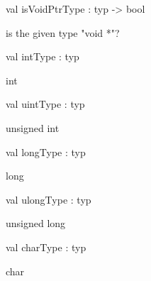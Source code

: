 \documentclass[11pt]{article}
\begin{document}
\label{val:Cil.isVoidPtrType}\begin{ocamldoccode}
val isVoidPtrType : typ -> bool
\end{ocamldoccode}
\begin{ocamldocdescription}
is the given type "void *"?


\end{ocamldocdescription}




\label{val:Cil.intType}\begin{ocamldoccode}
val intType : typ
\end{ocamldoccode}
\begin{ocamldocdescription}
int


\end{ocamldocdescription}




\label{val:Cil.uintType}\begin{ocamldoccode}
val uintType : typ
\end{ocamldoccode}
\begin{ocamldocdescription}
unsigned int


\end{ocamldocdescription}




\label{val:Cil.longType}\begin{ocamldoccode}
val longType : typ
\end{ocamldoccode}
\begin{ocamldocdescription}
long


\end{ocamldocdescription}




\label{val:Cil.ulongType}\begin{ocamldoccode}
val ulongType : typ
\end{ocamldoccode}
\begin{ocamldocdescription}
unsigned long


\end{ocamldocdescription}




\label{val:Cil.charType}\begin{ocamldoccode}
val charType : typ
\end{ocamldoccode}
\begin{ocamldocdescription}
char


\end{ocamldocdescription}
\end{document}
